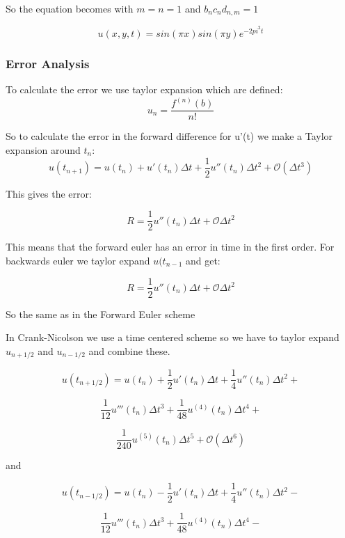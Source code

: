 \documentclass[a4paper,10pt]{article}
\begin{document}
So the equation becomes with $m=n=1$ and $b_nc_nd_{n,m} = 1$

\begin{equation}
 u(x,y,t) = sin(\pi x)sin(\pi y) e^{-2pi^2t}
\end{equation}

\subsubsection{Error Analysis}
To calculate the error we use taylor expansion which are defined:
\begin{equation}
 u_n = \frac{f^{(n)}(b)}{n!}
\end{equation}

So to calculate the error in the forward difference for u'(t) we make a Taylor expansion around $t_n$:
\begin{equation}
 u(t_{n+1}) = u(t_n) + u'(t_n)\Delta t + \frac{1}{2}u''(t_n)\Delta t^2 + \mathcal{O}(\Delta t^3)
\end{equation}

This gives the error:

\begin{equation}
 R = \frac{1}{2}u''(t_n)\Delta t + \mathcal{O}\Delta t^2
\end{equation}

This means that the forward euler has an error in time in the first order. 
For backwards euler we taylor expand $u(t_{n-1}$ and get:

\begin{equation}
  R = \frac{1}{2}u''(t_n)\Delta t + \mathcal{O}\Delta t^2
\end{equation}

So the same as in the Forward Euler scheme

In Crank-Nicolson we use a time centered scheme so we have to taylor expand $u_{n+ 1/2}$ and $u_{n-1/2}$ and combine these. 

\[u(t_{n+1/2}) = u(t_n) + \frac{1}{2} u'(t_n)\Delta t + \frac{1}{4} u''(t_n) \Delta t^2 + \]

\[ \frac{1}{12}u'''(t_n) \Delta t^3 + \frac{1}{48} u^{(4)}(t_n)\Delta t^4 + \]

\[ \frac{1}{240} u^{(5)} (t_n) \Delta t^5 + \mathcal{O}(\Delta t^6) \]

and

\[ u(t_{n-1/2}) = u(t_n) - \frac{1}{2} u'(t_n)\Delta t + \frac{1}{4} u''(t_n) \Delta t^2 - \]

\[  \frac{1}{12}u'''(t_n) \Delta t^3 + \frac{1}{48} u^{(4)}(t_n)\Delta t^4 - \]
\end{document}
